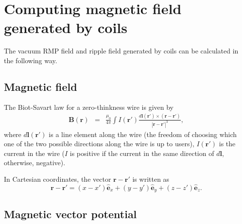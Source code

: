 \documentclass{llncs}
\begin{document}
\section{Computing magnetic field generated by coils}

The vacuum RMP field and ripple field generated by coils can be calculated in
the following way.

\subsection{Magnetic field}

The Biot-Savart law for a zero-thinkness wire is given by
\begin{eqnarray}
  \mathbf{B} (\mathbf{r}) & = & \frac{\mu_0}{4 \pi} \int I (\mathbf{r}')
  \frac{d\mathbf{l} (\mathbf{r}') \times (\mathbf{r}-\mathbf{r}')}{|
  \mathbf{r}-\mathbf{r}' |^3}, 
\end{eqnarray}
where $d\mathbf{l} (\mathbf{r}')$ is a line element along the wire (the
freedom of choosing which one of the two possible directions along the wire is
up to users), $I (\mathbf{r}')$ is the current in the wire ($I$ is positive if
the current in the same direction of $d\mathbf{l}$, otherwise, negative).

In Cartesian coordinates, the vector $\mathbf{r}-\mathbf{r}'$ is written as
\begin{equation}
  \label{16-12-16-e2} \mathbf{r}-\mathbf{r}' = (x - x') \hat{\mathbf{e}}_x +
  (y - y') \hat{\mathbf{e}}_y + (z - z') \hat{\mathbf{e}}_z .
\end{equation}

\subsection{Magnetic vector potential}
\end{document}
